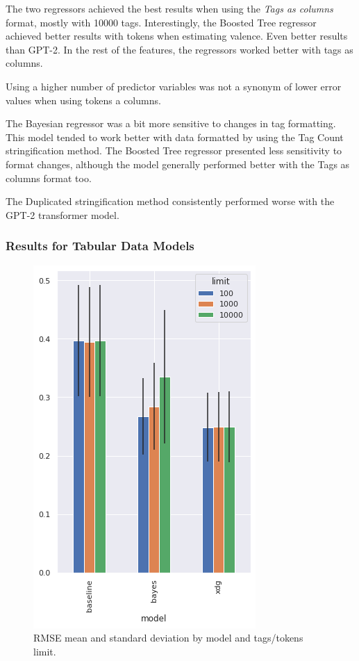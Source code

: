 \documentclass[sn-mathphys]{sn-jnl}%
\theoremstyle{thmstyleone}%
\theoremstyle{thmstyletwo}%
\theoremstyle{thmstylethree}%
\begin{document}
The two regressors achieved the best results when using the \emph{Tags as columns} format, mostly with \num{10000} tags.
Interestingly, the Boosted Tree regressor achieved better results with tokens when estimating valence.
Even better results than GPT-2.
In the rest of the features, the regressors worked better with tags as columns.

Using a higher number of predictor variables was not a synonym of lower error values when using tokens a columns.

The Bayesian regressor was a bit more sensitive to changes in tag formatting.
This model tended to work better with data formatted by using the Tag Count stringification method.
The Boosted Tree regressor presented less sensitivity to format changes, although the model generally performed better with the Tags as columns format too.

The Duplicated stringification method consistently performed worse with the GPT-2 transformer model.



\subsubsection{Results for Tabular Data Models}



\begin{figure}[h!]
      \centering
      \includegraphics{images/rmse_by_model_and_limit.png}
      \caption{RMSE mean and standard deviation by model and tags/tokens limit.}
      \label{fig:rmse_by_model_and_limit}
\end{figure}
\end{document}
